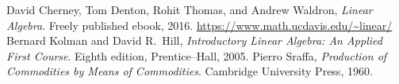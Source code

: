 \begin{thebibliography}{99}
David Cherney, Tom Denton, Rohit Thomas, and Andrew Waldron,\newline
\textit{Linear Algebra}.\newline
Freely published ebook, 2016.\newline
\url{https://www.math.ucdavis.edu/~linear/}
 Bernard Kolman and David R.\ Hill,\newline
\textit{Introductory Linear Algebra: An Applied First Course}.\newline
Eighth edition, Prentice--Hall, 2005.
 Pierro Sraffa,\newline
\textit{Production of Commodities by Means of Commodities}.\newline
Cambridge University Press, 1960.
\end{thebibliography}